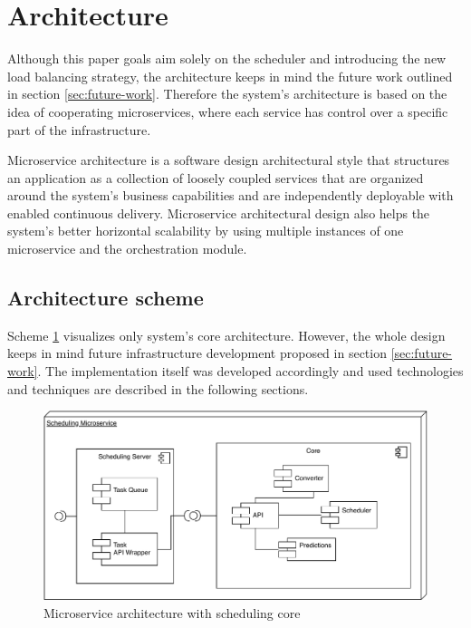 \section{Architecture}\label{{sec:architecture}}
Although this paper goals aim solely on the scheduler and introducing the new load balancing strategy,
the architecture keeps in mind the future work outlined in section \ref{sec:future-work}.
Therefore the system's architecture is based on the idea of cooperating microservices,
where each service has control over a specific part of the infrastructure. 

Microservice architecture is a software design architectural style 
that structures an application as a collection of loosely coupled services that are organized around the system's business capabilities\cite{namiot2014micro} 
and are independently deployable with enabled continuous delivery\cite{balalaie2016microservices}.
Microservice architectural design also helps the system's better horizontal scalability
by using multiple instances of one microservice 
and the orchestration module.

\subsection{Architecture scheme}\label{subsec:architecture-scheme}
Scheme \ref{fig:scheduling-core-arch} visualizes only system's core architecture. 
However,
the whole design keeps in mind future infrastructure development proposed in section \ref{sec:future-work}.
The implementation itself was developed accordingly 
and used technologies and techniques are described in the following sections.

\begin{figure}[ht]
    \includegraphics[width=\textwidth]{i_scheduler.pdf} 
    \centering
    \caption{Microservice architecture with scheduling core}
    \label{fig:scheduling-core-arch}
\end{figure}

